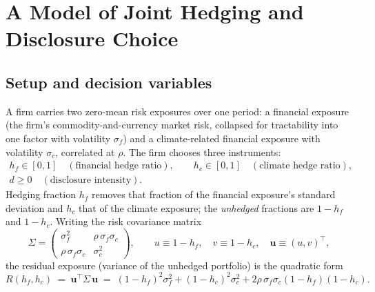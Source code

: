\documentclass[11pt,a4paper]{article}
\begin{document}
\section{A Model of Joint Hedging and Disclosure Choice}
\label{sec:model}

\subsection{Setup and decision variables}
\label{sec:setup}

A firm carries two zero-mean risk exposures over one period: a financial exposure (the firm's commodity-and-currency market risk, collapsed for tractability into one factor with volatility $\sigma_f$) and a climate-related financial exposure with volatility $\sigma_c$, correlated at $\rho$. The firm chooses three instruments:
\begin{equation}
\begin{gathered}
h_f\in[0,1]\quad(\text{financial hedge ratio}),\qquad h_c\in[0,1]\quad(\text{climate hedge ratio}),\\
d\ge 0\quad(\text{disclosure intensity}).
\end{gathered}
\end{equation}
Hedging fraction $h_f$ removes that fraction of the financial exposure's standard deviation and $h_c$ that of the climate exposure; the \emph{unhedged} fractions are $1-h_f$ and $1-h_c$. Writing the risk covariance matrix
\begin{equation}
\Sigma=\begin{pmatrix}\sigma_f^2 & \rho\,\sigma_f\sigma_c\\[2pt] \rho\,\sigma_f\sigma_c & \sigma_c^2\end{pmatrix},\qquad
u\equiv 1-h_f,\quad v\equiv 1-h_c,\quad \mathbf{u}\equiv(u,v)^\top,
\end{equation}
the residual exposure (variance of the unhedged portfolio) is the quadratic form
\begin{equation}
R(h_f,h_c)\;=\;\mathbf{u}^\top\Sigma\,\mathbf{u}\;=\;(1-h_f)^2\sigma_f^2+(1-h_c)^2\sigma_c^2+2\rho\,\sigma_f\sigma_c(1-h_f)(1-h_c).
\label{eq:R}
\end{equation}
\end{document}
